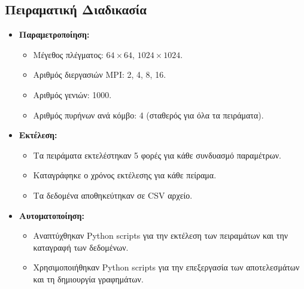 \documentclass{article}
\begin{document}
\subsection*{Πειραματική Διαδικασία}
\begin{itemize}
    \item \textbf{Παραμετροποίηση:}
    \begin{itemize}
        \item Μέγεθος πλέγματος: $64\times64$, $1024\times1024$.
        \item Αριθμός διεργασιών MPI: 2, 4, 8, 16.
        \item Αριθμός γενιών: 1000.
        \item Αριθμός πυρήνων ανά κόμβο: 4 (σταθερός για όλα τα πειράματα).
    \end{itemize}
    \item \textbf{Εκτέλεση:}
    \begin{itemize}
        \item Τα πειράματα εκτελέστηκαν 5 φορές για κάθε συνδυασμό παραμέτρων.
        \item Καταγράφηκε ο χρόνος εκτέλεσης για κάθε πείραμα.
        \item Τα δεδομένα αποθηκεύτηκαν σε CSV αρχείο.
    \end{itemize}
    \item \textbf{Αυτοματοποίηση:}
    \begin{itemize}
        \item Αναπτύχθηκαν Python scripts για την εκτέλεση των πειραμάτων και την καταγραφή των δεδομένων.
        \item Χρησιμοποιήθηκαν Python scripts για την επεξεργασία των αποτελεσμάτων και τη δημιουργία γραφημάτων.
    \end{itemize}
\end{itemize}
\end{document}
